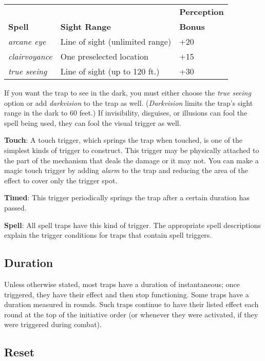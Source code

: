 \begin{tabular}{lll}
               &                      & \textbf{Perception} \\
\textbf{Spell} & \textbf{Sight Range} & \textbf{Bonus} \\
\textit{arcane eye} & Line of sight (unlimited range) & +20\\
\textit{clairvoyance} & One preselected location & +15\\
\textit{true seeing} & Line of sight (up to 120 ft.) & +30\\
\end{tabular}

If you want the trap to see in the dark, you must either choose the \textit{true seeing }option or add \textit{darkvision }to the trap as well. (\textit{Darkvision }limits the trap's sight range in the dark to 60 feet.) If invisibility, disguises, or illusions can fool the spell being used, they can fool the visual trigger as well. 
				
\textbf{Touch}: A touch trigger, which springs the trap when touched, is one of the simplest kinds of trigger to construct. This trigger may be physically attached to the part of the mechanism that deals the damage or it may not. You can make a magic touch trigger by adding \textit{alarm }to the trap and reducing the area of the effect to cover only the trigger spot.
				
\textbf{Timed}: This trigger periodically springs the trap after a certain duration has passed.
				
\textbf{Spell}: All spell traps have this kind of trigger. The appropriate spell descriptions explain the trigger conditions for traps that contain spell triggers.
				
\subsection{Duration}

				
Unless otherwise stated, most traps have a duration of instantaneous; once triggered, they have their effect and then stop functioning. Some traps have a duration measured in rounds. Such traps continue to have their listed effect each round at the top of the initiative order (or whenever they were activated, if they were triggered during combat).
				
\subsection{Reset}

